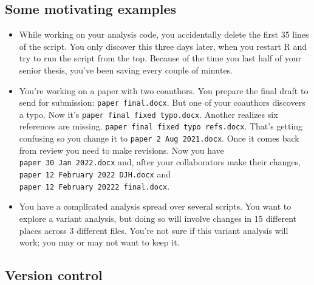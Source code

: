 \documentclass[
]{article}
\providecommand{\tightlist}{%
  \setlength{\itemsep}{0pt}\setlength{\parskip}{0pt}}
\begin{document}
\hypertarget{some-motivating-examples}{%
\subsection{Some motivating examples}\label{some-motivating-examples}}

\begin{itemize}
\tightlist
\item
  While working on your analysis code, you accidentally delete the first 35 lines of the script. You only discover this three days later, when you restart R and try to run the script from the top. Because of the time you last half of your senior thesis, you've been saving every couple of minutes.\\
\item
  You're working on a paper with two coauthors. You prepare the final draft to send for submission: \texttt{paper\ final.docx}. But one of your coauthors discovers a typo. Now it's \texttt{paper\ final\ fixed\ typo.docx}. Another realizes six references are missing. \texttt{paper\ final\ fixed\ typo\ refs.docx}. That's getting confusing so you change it to \texttt{paper\ 2\ Aug\ 2021.docx}. Once it comes back from review you need to make revisions. Now you have \texttt{paper\ 30\ Jan\ 2022.docx} and, after your collaborators make their changes, \texttt{paper\ 12\ February\ 2022\ DJH.docx} and \texttt{paper\ 12\ February\ 20222\ final.docx}.
\item
  You have a complicated analysis spread over several scripts. You want to explore a variant analysis, but doing so will involve changes in 15 different places across 3 different files. You're not sure if this variant analysis will work; you may or may not want to keep it.
\end{itemize}

\hypertarget{version-control}{%
\subsection{Version control}\label{version-control}}
\end{document}
